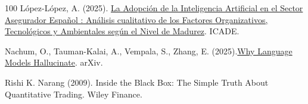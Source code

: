 \documentclass{article}
\begin{document}
\begin{thebibliography}{100}
 López-López, A. (2025). \href{http://hdl.handle.net/11531/107711}{La Adopción de la Inteligencia Artificial en el Sector Asegurador Español : Análisis cualitativo de los Factores Organizativos, Tecnológicos y Ambientales según el Nivel de Madurez}. ICADE. 

 Nachum, O., Tauman-Kalai, A., Vempala, S., Zhang, E. (2025).\href{https://arxiv.org/pdf/2509.04664}{Why Language Models Hallucinate}. arXiv. 

 Rishi K. Narang (2009). {Inside the Black Box: The Simple Truth About Quantitative Trading}. Wiley Finance.


\end{thebibliography}


 



\end{document}
